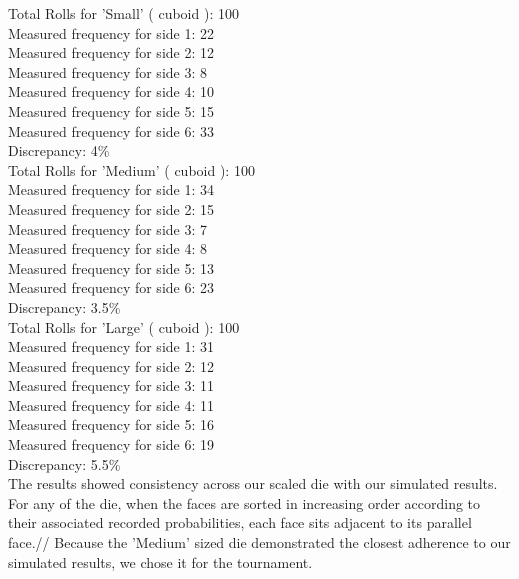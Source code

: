 Total Rolls for 'Small' ( cuboid ): 100\\
Measured frequency for side 1: 22\\
Measured frequency for side 2: 12\\
Measured frequency for side 3: 8\\
Measured frequency for side 4: 10\\
Measured frequency for side 5: 15\\
Measured frequency for side 6: 33\\
Discrepancy: 4\%\\

Total Rolls for 'Medium' ( cuboid ): 100\\
Measured frequency for side 1: 34\\
Measured frequency for side 2: 15\\
Measured frequency for side 3: 7\\
Measured frequency for side 4: 8\\
Measured frequency for side 5: 13\\
Measured frequency for side 6: 23\\
Discrepancy: 3.5\%\\

Total Rolls for 'Large' ( cuboid ): 100\\
Measured frequency for side 1: 31\\
Measured frequency for side 2: 12\\
Measured frequency for side 3: 11\\
Measured frequency for side 4: 11\\
Measured frequency for side 5: 16\\
Measured frequency for side 6: 19\\
Discrepancy: 5.5\%\\

The results showed consistency across our scaled die with our simulated results. For any of the die, when the faces are sorted in increasing order according to their associated recorded probabilities, each face sits adjacent to its parallel face.//
Because the 'Medium' sized die demonstrated the closest adherence to our simulated results, we chose it for the tournament.

